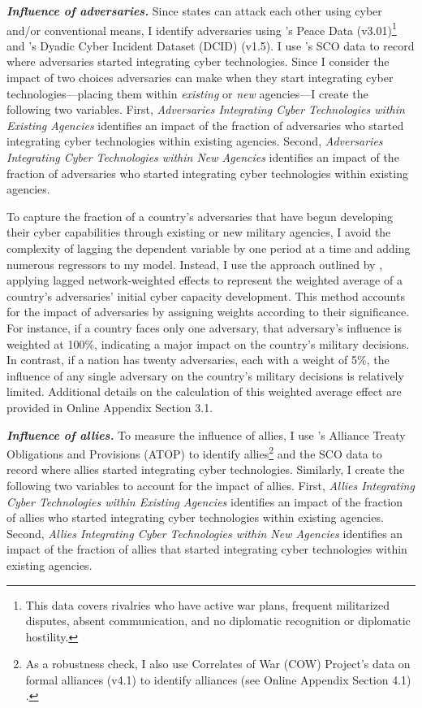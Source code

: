 \documentclass[12pt, letterpaper]{article}
\renewcommand{\baselinestretch}{1.35}
\let\oldfootnote\footnote
\renewcommand\footnote[1]{\oldfootnote{%
		\renewcommand\baselinestretch{.8}%
		\large\footnotesize\ignorespaces#1}} \addtolength{\footnotesep}{3pt}
\theoremstyle{plain}
\theoremstyle{remark}
\begin{document}
\noindent
\textbf{\textit{Influence of adversaries.}}
Since states can attack each other using cyber and/or conventional means, I identify adversaries using \citet{Diehl2021CMPS}'s Peace Data (v3.01)\footnote{
	This data covers rivalries who have active war plans, frequent militarized disputes, absent communication, and no diplomatic recognition or diplomatic hostility. 
		}
and \citet{valeriano2018cyber}'s Dyadic Cyber Incident Dataset (DCID) (v1.5).
I use \citet{Kostyuk2022MoD}'s SCO data to record where adversaries started integrating cyber technologies.
Since I consider the impact of two choices adversaries can make when they start integrating cyber technologies---placing them within \textit{existing} or \textit{new} agencies---I create the following two variables.
First, \textit{Adversaries Integrating Cyber Technologies within Existing Agencies} identifies an impact of the fraction of adversaries who started integrating cyber technologies within existing agencies.
Second, \textit{Adversaries Integrating Cyber Technologies within New Agencies} identifies an impact of the fraction of adversaries who started integrating cyber technologies within existing agencies.


To capture the fraction of a country's adversaries that have begun developing their cyber capabilities through existing or new military agencies, I avoid the complexity of lagging the dependent variable by one period at a time and adding numerous regressors to my model. Instead, I use the approach outlined by \citet{Simmons2004APSR}, applying lagged network-weighted effects to represent the weighted average of a country's adversaries' initial cyber capacity development. This method accounts for the impact of adversaries by assigning weights according to their significance. For instance, if a country faces only one adversary, that adversary’s influence is weighted at 100\%, indicating a major impact on the country’s military decisions. In contrast, if a nation has twenty adversaries, each with a weight of 5\%, the influence of any single adversary on the country’s military decisions is relatively limited. Additional details on the calculation of this weighted average effect are provided in Online Appendix Section 3.1.
\vspace{3mm} 


\noindent
\textbf{\textit{Influence of allies.}}
To measure the influence of allies, I use \citet{leeds2002alliance}'s Alliance Treaty Obligations and Provisions (ATOP) to identify allies\footnote{
	As a robustness check, I also use Correlates of War (COW) Project's data on formal alliances (v4.1) to identify alliances \citep{gibler2008international} (see Online Appendix Section 4.1) .
	} 
and the SCO data to record where allies started integrating cyber technologies.
Similarly, I create the following two variables to account for the impact of allies.
First, \textit{Allies Integrating Cyber Technologies within Existing Agencies} identifies an impact of the fraction of allies who started integrating cyber technologies within existing agencies.
Second, \textit{Allies Integrating Cyber Technologies within New Agencies} identifies an impact of the fraction of allies that started integrating cyber technologies within existing agencies.
\end{document}
